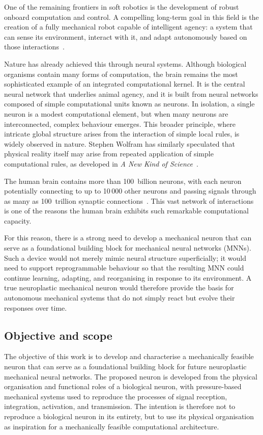 \documentclass[11pt,a4paper]{article}
\numberwithin{equation}{section}
\begin{document}
One of the remaining frontiers in soft robotics is the development of robust onboard computation and control. A
compelling long-term goal in this field is the creation of a fully mechanical robot capable of intelligent agency: a
system that can sense its environment, interact with it, and adapt autonomously based on those
interactions~\cite{rus2015soft}.

Nature has already achieved this through neural systems. Although biological organisms contain many forms of
computation, the brain remains the most sophisticated example of an integrated computational kernel. It is the
central neural network that underlies animal agency, and it is built from neural networks composed of simple
computational units known as neurons. In isolation, a single neuron is a modest computational element, but when
many neurons are interconnected, complex behaviour emerges. This broader principle, where intricate global
structure arises from the interaction of simple local rules, is widely observed in nature. Stephen Wolfram has
similarly speculated that physical reality itself may arise from repeated application of simple computational
rules, as developed in \emph{A New Kind of Science}~\cite{wolfram2002}.

The human brain contains more than 100~billion neurons, with each neuron potentially connecting to up to
10\,000 other neurons and passing signals through as many as 100~trillion synaptic
connections~\cite{zhang_neurons,stevens1979}. This vast network of interactions is one of the reasons the human
brain exhibits such remarkable computational capacity.

For this reason, there is a strong need to develop a mechanical neuron that can serve as a foundational building
block for mechanical neural networks (MNNs). Such a device would not merely mimic neural structure superficially; it
would need to support reprogrammable behaviour so that the resulting MNN could continue learning, adapting, and
reorganising in response to its environment. A true neuroplastic mechanical neuron would therefore provide the basis
for autonomous mechanical systems that do not simply react but evolve their responses over time.

\subsection{Objective and scope}

The objective of this work is to develop and characterise a mechanically feasible neuron that can serve as a
foundational building block for future neuroplastic mechanical neural networks. The proposed neuron is developed
from the physical organisation and functional roles of a biological neuron, with pressure-based mechanical systems
used to reproduce the processes of signal reception, integration, activation, and transmission. The intention is
therefore not to reproduce a biological neuron in its entirety, but to use its physical organisation as inspiration
for a mechanically feasible computational architecture.
\end{document}
